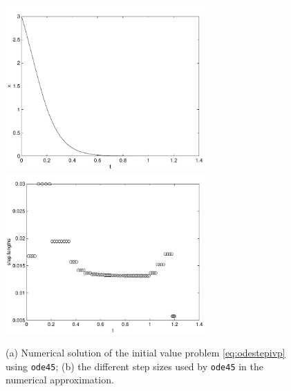 \documentclass{ximera}
\begin{document}
\begin{figure}[htb]
   \centerline{%
   \includegraphics[width=3in]{../figures/ode45step1.pdf}
   \includegraphics[width=3in]{../figures/ode45step2.pdf}}
   \caption{(a) Numerical solution of the initial value problem
   \protect\eqref{eq:odestepivp} using {\tt ode45};
   (b) the different step sizes used by {\tt ode45} in
   the numerical approximation.}
   \label{fig:ode45step}
\end{figure}
\end{document}
